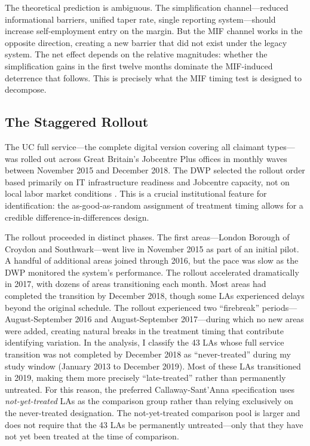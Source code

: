 \documentclass[12pt]{article}
\begin{document}
The theoretical prediction is ambiguous. The simplification channel---reduced informational barriers, unified taper rate, single reporting system---should increase self-employment entry on the margin. But the MIF channel works in the opposite direction, creating a new barrier that did not exist under the legacy system. The net effect depends on the relative magnitudes: whether the simplification gains in the first twelve months dominate the MIF-induced deterrence that follows. This is precisely what the MIF timing test is designed to decompose.

\subsection{The Staggered Rollout}

The UC full service---the complete digital version covering all claimant types---was rolled out across Great Britain's Jobcentre Plus offices in monthly waves between November 2015 and December 2018. The DWP selected the rollout order based primarily on IT infrastructure readiness and Jobcentre capacity, not on local labor market conditions \citep{dwp2018rollout}. This is a crucial institutional feature for identification: the as-good-as-random assignment of treatment timing allows for a credible difference-in-differences design.

The rollout proceeded in distinct phases. The first areas---London Borough of Croydon and Southwark---went live in November 2015 as part of an initial pilot. A handful of additional areas joined through 2016, but the pace was slow as the DWP monitored the system's performance. The rollout accelerated dramatically in 2017, with dozens of areas transitioning each month. Most areas had completed the transition by December 2018, though some LAs experienced delays beyond the original schedule. The rollout experienced two ``firebreak'' periods---August-September 2016 and August-September 2017---during which no new areas were added, creating natural breaks in the treatment timing that contribute identifying variation. In the analysis, I classify the 43 LAs whose full service transition was not completed by December 2018 as ``never-treated'' during my study window (January 2013 to December 2019). Most of these LAs transitioned in 2019, making them more precisely ``late-treated'' rather than permanently untreated. For this reason, the preferred Callaway-Sant'Anna specification uses \textit{not-yet-treated} LAs as the comparison group rather than relying exclusively on the never-treated designation. The not-yet-treated comparison pool is larger and does not require that the 43 LAs be permanently untreated---only that they have not yet been treated at the time of comparison.
\end{document}
